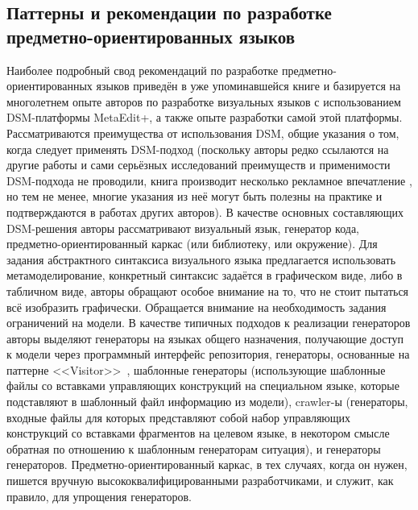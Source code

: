 \subsection{Паттерны и рекомендации по разработке предметно-ориентированных языков}
Наиболее подробный свод рекомендаций по разработке предметно-ориентированных языков
приведён в уже упоминавшейся книге \cite{kelly2008domain} и базируется на многолетнем
опыте авторов по разработке визуальных языков с использованием \ac{DSM}-платформы MetaEdit+,
а также опыте разработки самой этой платформы. Рассматриваются преимущества от использования
\ac{DSM}, общие указания о том, когда следует применять \ac{DSM}-подход (поскольку авторы редко
ссылаются на другие работы и сами серьёзных исследований преимуществ и применимости
\ac{DSM}-подхода не проводили, книга производит несколько рекламное впечатление%
, но тем не менее, многие указания из неё могут быть полезны на практике и подтверждаются в работах других 
авторов). В качестве основных составляющих \ac{DSM}-решения авторы рассматривают визуальный 
язык, генератор кода, предметно-ориентированный каркас (или библиотеку, или окружение). 
Для задания абстрактного синтаксиса визуального языка предлагается использовать метамоделирование, 
конкретный синтаксис задаётся в графическом виде, либо в табличном виде, авторы обращают особое 
внимание на то, что не стоит пытаться всё изобразить графически. Обращается внимание 
на необходимость задания ограничений на модели. В качестве типичных подходов к реализации 
генераторов авторы выделяют генераторы на языках общего назначения, получающие доступ 
к модели через программный интерфейс репозитория, генераторы, основанные на паттерне <<Visitor>>~\cite{gamma2001patterns }, 
шаблонные генераторы (использующие шаблонные файлы со вставками управляющих конструкций на специальном языке, которые 
подставляют в шаблонный файл информацию из модели), crawler-ы (генераторы, входные файлы для которых представляют собой набор 
управляющих конструкций со вставками фрагментов на целевом языке, в некотором смысле 
обратная по отношению к шаблонным генераторам ситуация), и генераторы генераторов. 
Предметно-ориентированный каркас, в тех случаях, когда он нужен, пишется вручную высококвалифицированными 
разработчиками, и служит, как правило, для упрощения генераторов.

